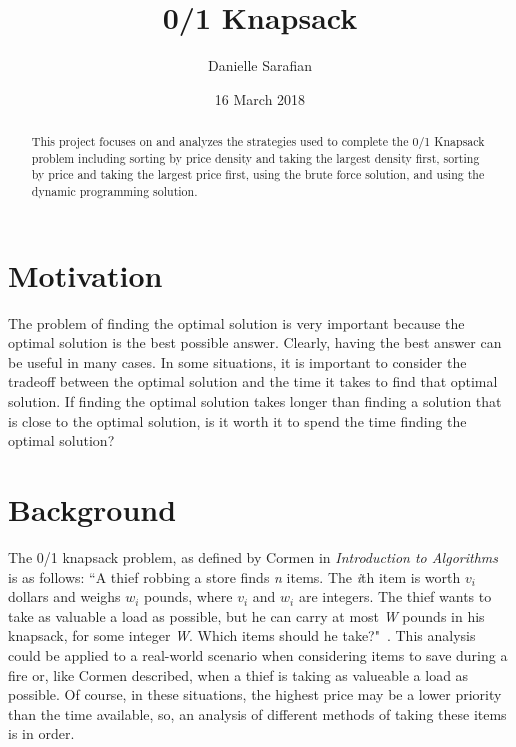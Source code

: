 \documentclass[onecolumn, letterpaper, 12pt]{article}
\begin{document}
\thispagestyle{empty} %




\title{0/1 Knapsack}
\author{Danielle Sarafian}
\date{16 March 2018}
\maketitle 




\begin{abstract}

This project focuses on and analyzes the strategies used to complete the 0/1 Knapsack problem including sorting by price density and taking the largest density first, sorting by price and taking the largest price first, using the brute force solution, and using the dynamic programming solution.

\end{abstract}
\section{Motivation}
The problem of finding the optimal solution is very important because the optimal solution is the best possible answer. Clearly, having the best answer can be useful in many cases. In some situations, it is important to consider the tradeoff between the optimal solution and the time it takes to find that optimal solution. If finding the optimal solution takes longer than finding a solution that is close to the optimal solution, is it worth it to spend the time finding the optimal solution?

\section{Background}
The 0/1 knapsack problem, as defined by Cormen in \textit{Introduction to Algorithms} is as follows: ``A thief robbing a store finds \textit{n} items. The \textit{i}th item is worth $v_i$ dollars and weighs $w_i$ pounds, where $v_i$ and $w_i$ are integers. The thief wants to take as valuable a load as possible, but he can carry at most \textit{W} pounds in his knapsack, for some integer \textit{W}. Which items should he take?"~\cite{cormen2001introduction}. This analysis could be applied to a real-world scenario when considering items to save during a fire or, like Cormen described, when a thief is taking as valueable a load as possible. Of course, in these situations, the highest price may be a lower priority than the time available, so, an analysis of different methods of taking these items is in order.
\end{document}
